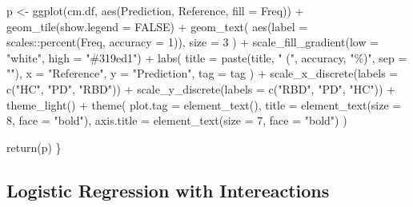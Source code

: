 \documentclass[
  english,
  doc,floatsintext]{apa6}
\newenvironment{Shaded}{\begin{snugshade}}{\end{snugshade}}
\newcommand{\AttributeTok}[1]{\textcolor[rgb]{0.77,0.63,0.00}{#1}}
\newcommand{\ConstantTok}[1]{\textcolor[rgb]{0.00,0.00,0.00}{#1}}
\newcommand{\DecValTok}[1]{\textcolor[rgb]{0.00,0.00,0.81}{#1}}
\newcommand{\FunctionTok}[1]{\textcolor[rgb]{0.00,0.00,0.00}{#1}}
\newcommand{\NormalTok}[1]{#1}
\newcommand{\OtherTok}[1]{\textcolor[rgb]{0.56,0.35,0.01}{#1}}
\newcommand{\SpecialCharTok}[1]{\textcolor[rgb]{0.00,0.00,0.00}{#1}}
\newcommand{\StringTok}[1]{\textcolor[rgb]{0.31,0.60,0.02}{#1}}
\begin{document}
\begin{Shaded}
\begin{Highlighting}[]
\NormalTok{    p }\OtherTok{\textless{}{-}} \FunctionTok{ggplot}\NormalTok{(cm.df, }\FunctionTok{aes}\NormalTok{(Prediction, Reference, }\AttributeTok{fill =}\NormalTok{ Freq)) }\SpecialCharTok{+}
        \FunctionTok{geom\_tile}\NormalTok{(}\AttributeTok{show.legend =} \ConstantTok{FALSE}\NormalTok{) }\SpecialCharTok{+}
        \FunctionTok{geom\_text}\NormalTok{(}
            \FunctionTok{aes}\NormalTok{(}\AttributeTok{label =}\NormalTok{ scales}\SpecialCharTok{::}\FunctionTok{percent}\NormalTok{(Freq, }\AttributeTok{accuracy =} \DecValTok{1}\NormalTok{)),}
            \AttributeTok{size =} \DecValTok{3}
\NormalTok{        ) }\SpecialCharTok{+}
        \FunctionTok{scale\_fill\_gradient}\NormalTok{(}\AttributeTok{low =} \StringTok{"white"}\NormalTok{, }\AttributeTok{high =} \StringTok{"\#319ed1"}\NormalTok{) }\SpecialCharTok{+}
        \FunctionTok{labs}\NormalTok{(}
            \AttributeTok{title =} \FunctionTok{paste}\NormalTok{(title, }\StringTok{" ("}\NormalTok{, accuracy, }\StringTok{"\%)"}\NormalTok{, }\AttributeTok{sep =} \StringTok{""}\NormalTok{),}
            \AttributeTok{x =} \StringTok{"Reference"}\NormalTok{, }\AttributeTok{y =} \StringTok{"Prediction"}\NormalTok{, }\AttributeTok{tag =}\NormalTok{ tag}
\NormalTok{        ) }\SpecialCharTok{+}
        \FunctionTok{scale\_x\_discrete}\NormalTok{(}\AttributeTok{labels =} \FunctionTok{c}\NormalTok{(}\StringTok{"HC"}\NormalTok{, }\StringTok{"PD"}\NormalTok{, }\StringTok{"RBD"}\NormalTok{)) }\SpecialCharTok{+}
        \FunctionTok{scale\_y\_discrete}\NormalTok{(}\AttributeTok{labels =} \FunctionTok{c}\NormalTok{(}\StringTok{"RBD"}\NormalTok{, }\StringTok{"PD"}\NormalTok{, }\StringTok{"HC"}\NormalTok{)) }\SpecialCharTok{+}
        \FunctionTok{theme\_light}\NormalTok{() }\SpecialCharTok{+}
        \FunctionTok{theme}\NormalTok{(}
            \AttributeTok{plot.tag =} \FunctionTok{element\_text}\NormalTok{(),}
            \AttributeTok{title =} \FunctionTok{element\_text}\NormalTok{(}\AttributeTok{size =} \DecValTok{8}\NormalTok{, }\AttributeTok{face =} \StringTok{"bold"}\NormalTok{),}
            \AttributeTok{axis.title =} \FunctionTok{element\_text}\NormalTok{(}\AttributeTok{size =} \DecValTok{7}\NormalTok{, }\AttributeTok{face =} \StringTok{"bold"}\NormalTok{)}
\NormalTok{        )}

    \FunctionTok{return}\NormalTok{(p)}
\NormalTok{\}}
\end{Highlighting}
\end{Shaded}

\hypertarget{logistic-regression-with-intereactions}{%
\subsection{Logistic Regression with Intereactions}\label{logistic-regression-with-intereactions}}
\end{document}
